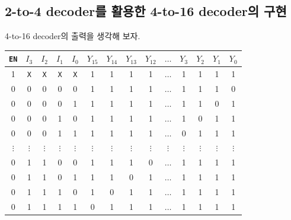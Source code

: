 \documentclass{scrartcl}
\begin{document}
\subsection{2-to-4 decoder를 활용한 4-to-16 decoder의 구현}
4-to-16 decoder의 출력을 생각해 보자.
\begin{table}[H]
  \centering
  \begin{tabular}{|ccccc|ccccccccc|}
    \hline
    \texttt{EN} & \(I_3\)    & \(I_2\)    & \(I_1\)    & \(I_0\)    & \(Y_{15}\) & \(Y_{14}\) & \(Y_{13}\) & \(Y_{12}\) & \(\dots\) & \(Y_3\) & \(Y_2\) & \(Y_1\) & \(Y_0\) \\ \hline
    1           & \texttt{X} & \texttt{X} & \texttt{X} & \texttt{X} & 1        & 1        & 1        & 1        & \(\dots\) & 1       & 1       & 1       & 1       \\
    \hline
    0           & 0          & 0          & 0          & 0          & 1        & 1        & 1        & 1        & \(\dots\)  & 1       & 1       & 1       & 0       \\
    0           & 0          & 0          & 0          & 1          & 1        & 1        & 1        & 1        & \(\dots\)  & 1       & 1       & 0       & 1      \\
    0           & 0          & 0          & 1          & 0          & 1        & 1        & 1        & 1        & \(\dots\)  & 1       & 0       & 1       & 1      \\
    0           & 0          & 0          & 1          & 1          & 1        & 1        & 1        & 1        & \(\dots\)  & 0       & 1       & 1       & 1      \\
    \(\vdots\)  & \(\vdots\) & \(\vdots\) & \(\vdots\) & \(\vdots\) & \(\vdots\) & \(\vdots\) & \(\vdots\) & \(\vdots\) & \(\vdots\) & \(\vdots\) & \(\vdots\) & \(\vdots\) & \(\vdots\) \\
    0           & 1          & 1          & 0          & 0          & 1        & 1        & 1        & 0        & \(\dots\)  & 1       & 1       & 1       & 1       \\
    0           & 1          & 1          & 0          & 1          & 1        & 1        & 0        & 1        & \(\dots\)  & 1       & 1       & 1       & 1      \\
    0           & 1          & 1          & 1          & 0          & 1        & 0        & 1        & 1        & \(\dots\)  & 1       & 1       & 1       & 1      \\
    0           & 1          & 1          & 1          & 1          & 0        & 1        & 1        & 1        & \(\dots\)  & 1       & 1       & 1       & 1      \\
    \hline
  \end{tabular}
\end{table}
\end{document}
